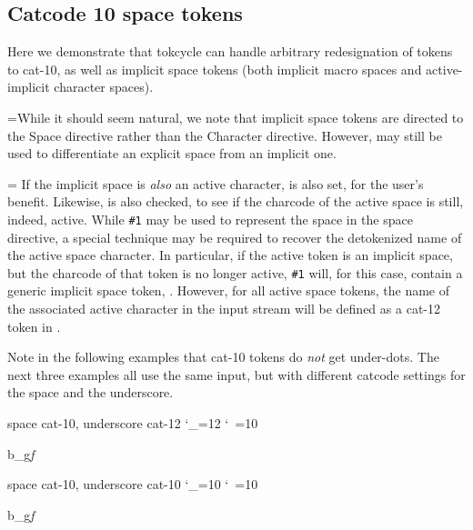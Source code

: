 \documentclass[10pt]{article}
\def\ddbend{\setbox0=\hbox{\dbend\dbend}\leavevmode\llap{%
  \raisebox{10pt}{\box0~}}}
\newcommand\TokCycle{\textsf{tokcycle}}
\begin{document}
\endgroup

\subsection{Catcode 10 space tokens\label{s:spc}}

\begingroup

Here we demonstrate that \TokCycle{} can handle arbitrary redesignation
  of tokens to cat-10, as well as implicit space tokens (both implicit
  macro spaces and active-implicit character spaces).

\ddbend While it should seem natural, we note that implicit
  space tokens are directed to the Space directive rather than
  the Character directive.
However,  may still be used to 
  differentiate an explicit space from an implicit one.


\ddbend
If the implicit space is \textit{also} an active character, 
   is also set, for the user's benefit.
Likewise,  is also checked, to see
  if the charcode of the active space is still, indeed, active.
While \verb|#1| may be used to represent the space in the space directive,
  a special technique may be required to recover the detokenized name of the 
  active space character.
In particular, if the active token is an implicit space, but the charcode
  of that token is no longer active, \verb|#1| will, for this case, 
  contain a generic implicit space token, .
However, for all active space tokens, the name of the associated active 
  character in the input stream will be defined as a cat-12 token in 
  .

\medskip
Note in the following examples that cat-10 tokens do \textit{not}
  get under-dots.
The next three examples all use the same input, but with different
catcode settings for the space and the underscore.

\fboxsep=1pt

\begin{exampleA}[lefthand width=10cm]{space cat-10{,} underscore cat-12}
\catcode`\_=12 %
\catcode`\ =10 %

%
{}%
{}%
{}%
 b_g\itshape f\upshape\endtokencycle
\end{exampleA}
%
\begin{exampleA}[lefthand width=10cm]{space cat-10{,} underscore cat-10}
\catcode`\_=10 %
\catcode`\ =10 %

%
{}%
{}%
{}%
 b_g\itshape f\upshape\endtokencycle
\end{exampleA}
\end{document}
